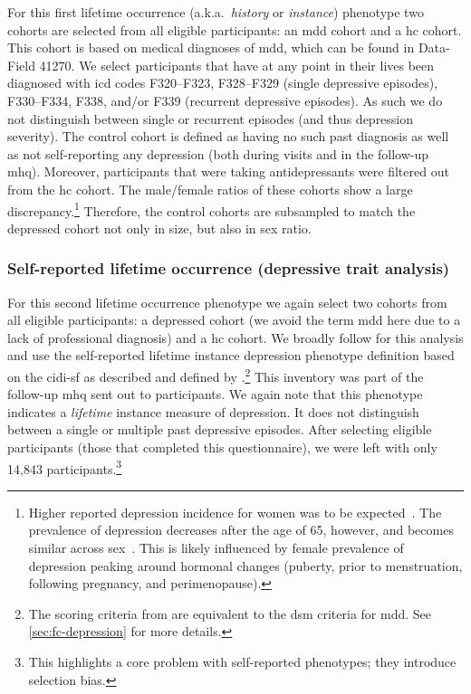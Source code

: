 For this first lifetime occurrence (a.k.a.~\emph{history} or \emph{instance}) phenotype two cohorts are selected from all eligible participants: an \gls{mdd} cohort and a \gls{hc} cohort.
This cohort is based on medical diagnoses of \gls{mdd}, which can be found in Data-Field 41270.
We select participants that have at any point in their lives been diagnosed with \gls{icd} codes F320--F323, F328--F329 (single depressive episodes), F330--F334, F338, and/or F339 (recurrent depressive episodes).
As such we do not distinguish between single or recurrent episodes (and thus depression severity).
The control cohort is defined as having no such past diagnosis as well as not self-reporting any depression (both during visits and in the follow-up \gls{mhq}).
Moreover, participants that were taking antidepressants were filtered out from the \gls{hc} cohort.
%
The male/female ratios of these cohorts show a large discrepancy.\footnote{Higher reported depression incidence for women was to be expected~\parencite{Albert2015, Bogren2018}. The prevalence of depression decreases after the age of 65, however, and becomes similar across sex~\parencite{Bebbington2003}. This is likely influenced by female prevalence of depression peaking around hormonal changes (puberty, prior to menstruation, following pregnancy, and perimenopause).}
Therefore, the control cohorts are subsampled to match the depressed cohort not only in size, but also in sex ratio.

\subsubsection{Self-reported lifetime occurrence (depressive trait analysis)}

For this second lifetime occurrence phenotype we again select two cohorts from all eligible participants: a depressed cohort (we avoid the term \gls{mdd} here due to a lack of professional diagnosis) and a \gls{hc} cohort.
We broadly follow \textcite{Howard2020} for this analysis and use the self-reported lifetime instance depression phenotype definition based on the \gls{cidi-sf} \parencite{Kessler1998} as described and defined by \textcite{Davis2020}.\footnote{The scoring criteria from \textcite{Davis2020} are equivalent to the \gls{dsm} criteria for \gls{mdd}. See \cref{sec:fc-depression} for more details.}
This inventory was part of the follow-up \gls{mhq} sent out to participants.
We again note that this phenotype indicates a \emph{lifetime} instance measure of depression.
It does not distinguish between a single or multiple past depressive episodes.
After selecting eligible participants (those that completed this questionnaire), we were left with only 14,843 participants.\footnote{This highlights a core problem with self-reported phenotypes; they introduce selection bias.}

